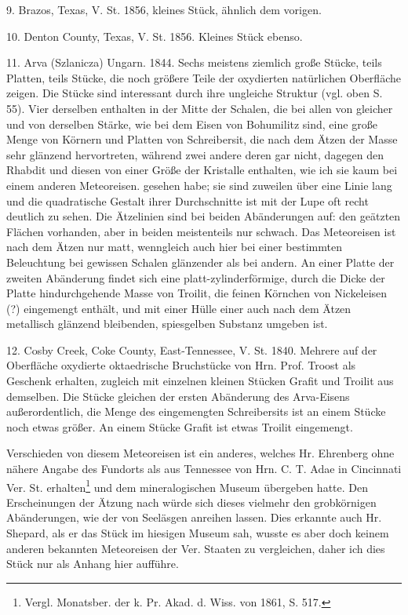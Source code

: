 \documentclass[a4paper, 11pt, oneside]{article}
\begin{document}
9. Brazos, Texas, V. St. 1856, kleines Stück, ähnlich dem vorigen.

10. Denton County, Texas, V. St. 1856. Kleines Stück ebenso.

11. Arva (Szlanicza) Ungarn. 1844. Sechs meistens ziemlich große Stücke, teils Platten, teils Stücke, die noch größere Teile der oxydierten natürlichen Oberfläche zeigen. Die Stücke sind interessant durch ihre ungleiche Struktur (vgl. oben S. 55). Vier derselben enthalten in der Mitte der Schalen, die bei allen von gleicher und von derselben Stärke, wie bei dem Eisen von Bohumilitz sind, eine große Menge von Körnern und Platten von Schreibersit, die nach dem Ätzen der Masse sehr glänzend hervortreten, während zwei andere deren gar nicht, dagegen den Rhabdit und diesen von einer Größe der Kristalle enthalten, wie ich sie kaum bei einem anderen Meteoreisen. gesehen habe; sie sind zuweilen über eine Linie lang und die quadratische Gestalt ihrer Durchschnitte ist mit der Lupe oft recht deutlich zu sehen. Die Ätzelinien sind bei beiden Abänderungen auf: den geätzten Flächen vorhanden, aber in beiden meistenteils nur schwach. Das Meteoreisen ist nach dem Ätzen nur matt, wenngleich auch hier bei einer bestimmten Beleuchtung bei gewissen Schalen glänzender als bei andern. An einer Platte der zweiten Abänderung findet sich eine platt-zylinderförmige, durch die Dicke der Platte hindurchgehende Masse von Troilit, die feinen Körnchen von Nickeleisen (?) eingemengt enthält, und mit einer Hülle einer auch nach dem Ätzen metallisch glänzend bleibenden, spiesgelben Substanz umgeben ist.

12. Cosby Creek, Coke County, East-Tennessee, V. St. 1840. Mehrere auf der Oberfläche oxydierte oktaedrische Bruchstücke von Hrn. Prof. Troost als Geschenk erhalten, zugleich mit einzelnen kleinen Stücken Grafit und Troilit aus demselben. Die Stücke gleichen der ersten Abänderung des Arva-Eisens außerordentlich, die Menge des eingemengten Schreibersits ist an einem Stücke noch etwas größer. An einem Stücke Grafit ist etwas Troilit eingemengt.

Verschieden von diesem Meteoreisen ist ein anderes, welches Hr. Ehrenberg ohne nähere Angabe des Fundorts als aus Tennessee von Hrn. C. T. Adae in Cincinnati Ver. St. erhalten\footnote{Vergl. Monatsber. der k. Pr. Akad. d. Wiss. von 1861, S. 517.} und dem mineralogischen Museum übergeben hatte. Den Erscheinungen der Ätzung nach würde sich dieses vielmehr den grobkörnigen Abänderungen, wie der von Seeläsgen anreihen lassen. Dies erkannte auch Hr. Shepard, als er das Stück im hiesigen Museum sah, wusste es aber doch keinem anderen bekannten Meteoreisen der Ver. Staaten zu vergleichen, daher ich dies Stück nur als Anhang hier aufführe.
\end{document}
